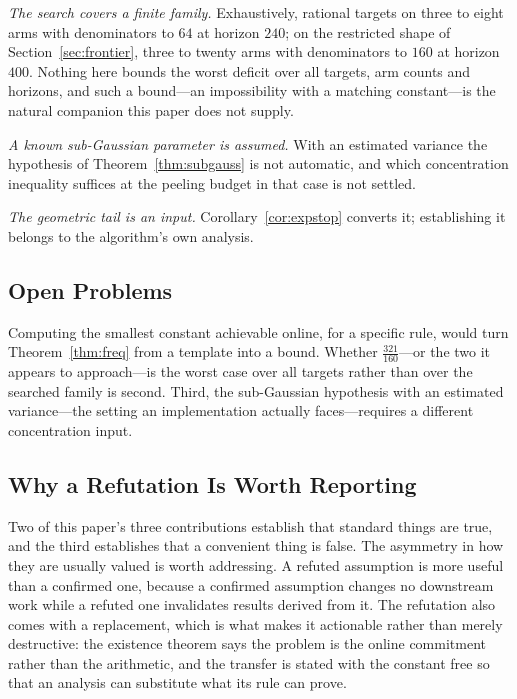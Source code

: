 \emph{The search covers a finite family.} Exhaustively, rational targets on three to eight
arms with denominators to $64$ at horizon $240$; on the restricted shape of
Section~\ref{sec:frontier}, three to twenty arms with denominators to $160$ at horizon $400$. Nothing here bounds the worst deficit over all
targets, arm counts and horizons, and such a bound---an impossibility with a matching
constant---is the natural companion this paper does not supply.

\emph{A known sub-Gaussian parameter is assumed.} With an estimated variance the hypothesis of
Theorem~\ref{thm:subgauss} is not automatic, and which concentration inequality suffices at the
peeling budget in that case is not settled.

\emph{The geometric tail is an input.} Corollary~\ref{cor:expstop} converts it; establishing it
belongs to the algorithm's own analysis.

\subsection{Open Problems}

Computing the smallest constant achievable online, for a specific rule, would turn
Theorem~\ref{thm:freq} from a template into a bound. Whether $\tfrac{321}{160}$---or the two
it appears to approach---is the worst case over
all targets rather than over the searched family is second. Third, the sub-Gaussian hypothesis
with an estimated variance---the setting an implementation actually faces---requires a
different concentration input.

\subsection{Why a Refutation Is Worth Reporting}

Two of this paper's three contributions establish that standard things are true, and the third
establishes that a convenient thing is false. The asymmetry in how they are usually valued is
worth addressing. A refuted assumption is more useful than a confirmed one, because a confirmed
assumption changes no downstream work while a refuted one invalidates results derived from it.
The refutation also comes with a replacement, which is what makes it actionable rather than
merely destructive: the existence theorem says the problem is the online commitment rather than
the arithmetic, and the transfer is stated with the constant free so that an analysis can
substitute what its rule can prove.

